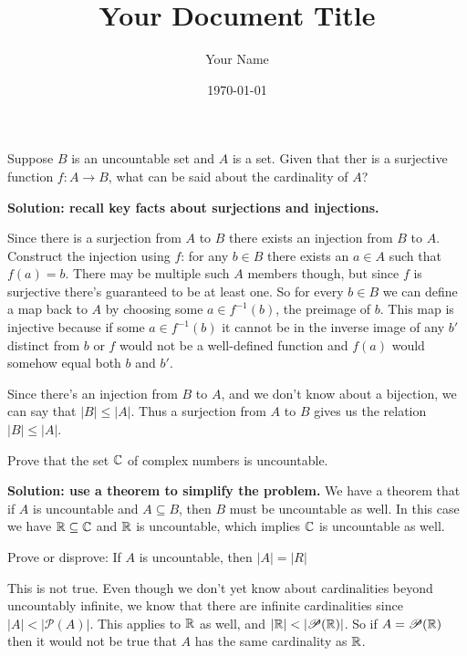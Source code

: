 \documentclass{article}
\title{Your Document Title}
\author{Your Name}
\date{\today} %
\begin{document}
\maketitle

\begin{problem}
Suppose $B$ is an uncountable set and $A$ is a set. Given that ther is a surjective function $f: A \to B$, what can be said about the cardinality of $A$?
\end{problem}

\textbf{Solution: recall key facts about surjections and injections.}

Since there is a surjection from $A$ to $B$ there exists an injection from $B$ to $A$. Construct the injection using $f$: for any $b \in B$ there exists an $a \in A$ such that $f(a) = b$. There may be multiple such $A$ members though, but since $f$ is surjective there's guaranteed to be at least one. So for every $b \in B$ we can define a map back to $A$ by choosing some $a \in f^{-1}(b)$, the preimage of $b$. This map is injective because if some $a \in f^{-1}(b)$ it cannot be in the inverse image of any $b'$ distinct from $b$ or $f$ would not be a well-defined function and $f(a)$ would somehow equal both $b$ and $b'$.

Since there's an injection from $B$ to $A$, and we don't know about a bijection, we can say that $|B| \leq |A|$. Thus a surjection from $A$ to $B$ gives us the relation $|B| \leq |A|$.

\begin{problem}
Prove that the set $\mathbb{C}$ of complex numbers is uncountable.
\end{problem}

\textbf{Solution: use a theorem to simplify the problem.} We have a theorem that if $A$ is uncountable and $A \subseteq B$, then $B$ must be uncountable as well. In this case we have $\mathbb{R} \subseteq \mathbb{C}$ and $\mathbb{R}$ is uncountable, which implies $\mathbb{C}$ is uncountable as well.

\begin{problem}
Prove or disprove: If $A$ is uncountable, then $|A| = |R|$
\end{problem}

This is not true. Even though we don't yet know about cardinalities beyond uncountably infinite, we know that there are infinite cardinalities since $|A| < |\mathscr{P}(A)|$. This applies to $\mathbb{R}$ as well, and $|\mathbb{R}| < |\mathscr{P}(\mathbb{R})|$. So if $A = \mathscr{P}(\mathbb{R})$ then it would not be true that $A$ has the same cardinality as $\mathbb{R}$.
\end{document}
